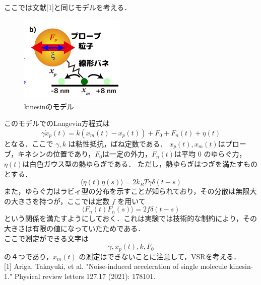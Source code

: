 \documentclass{jsarticle}
\title{}
\author{八木俊輔}
\date{\today}
\theoremstyle{definition}
\begin{document}
ここでは文献[1]と同じモデルを考える．
\begin{figure}[H]
  \begin{center}
  \includegraphics[width=5cm]{kinesin.png}
  \end{center}
  \caption{kinesinのモデル}
\end{figure}
このモデルでのLangevin方程式は
\begin{equation}
  \gamma \dot{x}_p(t) = k (x_m (t) - x_p(t)) + F_0 + F_n (t) + \eta(t)
\end{equation}
となる．ここで $\gamma, k$ は粘性抵抗，ばね定数である．
$x_p(t), x_m (t)$はプローブ，キネシンの位置であり，$F_0$は一定の外力，$F_n (t)$は平均 $0$ のゆらぐ力，$\eta (t)$は白色ガウス型の熱ゆらぎである．
ただし，熱ゆらぎはつぎを満たすものとする．
\begin{equation}
  \langle \eta (t) \eta (s) \rangle = 2 k_B T \gamma \delta (t-s)
\end{equation}
また，ゆらぐ力はラビィ型の分布を示すことが知られており，その分散は無限大の大きさを持つが，ここでは定数 $f$ を用いて
\begin{equation}
  \langle F_n (t) F_n (s) \rangle = 2 f \delta (t-s)
\end{equation}
という関係を満たすようにしておく．これは実験では技術的な制約により，その大きさは有限の値になっていたためである．\\
\quad ここで測定ができる文字は 
\begin{equation}
  \gamma, x_p (t), k, F_0
\end{equation}
の４つであり，$x_m (t)$ の測定はできないことに注意して，VSRを考える．\\

[1] Ariga, Takayuki, et al. "Noise-induced acceleration of single molecule kinesin-1." Physical review letters 127.17 (2021): 178101.
\end{document}

